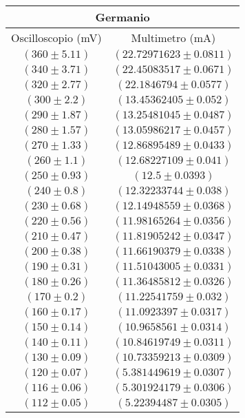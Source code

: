 \documentclass[@SRC@/main]{subfiles}
\begin{document}
\begin{center}
  \begin{tabular}{ ||c|c|| }
  \hline
  \multicolumn{2}{||c||}{Germanio}\\
  \hline
  Oscilloscopio (mV) & Multimetro (mA) \\
  \hline
  $(360\pm 5.11 )$ & $(22.72971623\pm 0.0811)$ \\
  \hline
  $(340\pm 3.71 )$ & $(22.45083517\pm 0.0671)$ \\
  \hline
  $(320\pm 2.77 )$ & $(22.1846794\pm 0.0577)$ \\
  \hline
  $(300\pm 2.2 )$ & $(13.45362405\pm 0.052)$\\
  \hline
   $(290\pm 1.87)$ & $(13.25481045\pm0.0487)$ \\
  \hline
   $(280\pm 1.57 )$ & $(13.05986217\pm0.0457)$ \\
  \hline
   $(270\pm 1.33 )$ & $(12.86895489\pm0.0433)$ \\
  \hline
   $(260\pm 1.1 )$ & $(12.68227109\pm0.041)$ \\
  \hline
  $(250\pm 0.93 )$ & $(12.5\pm0.0393)$ \\
  \hline
   $(240\pm 0.8 )$ & $(12.32233744\pm0.038)$ \\
  \hline
  $(230\pm 0.68  )$ & $(12.14948559\pm0.0368)$ \\
  \hline 
  $(220\pm 0.56 )$ & $(11.98165264\pm0.0356)$ \\
  \hline 
  $(210\pm 0.47 )$ & $(11.81905242\pm0. 0347)$ \\
  \hline 
  $(200\pm 0.38 )$ & $(11.66190379\pm0.0338)$ \\
  \hline 
  $(190\pm 0.31 )$ & $(11.51043005\pm0.0331)$ \\
  \hline 
  $(180\pm 0.26 )$ & $(11.36485812 \pm0.0326)$ \\
  \hline 
  $(170\pm 0.2 )$ & $(11.22541759 \pm0.032)$ \\
  \hline 
  $(160\pm 0.17 )$ & $(11.0923397	 \pm0.0317)$ \\
  \hline 
  $(150\pm 0.14 )$ & $(10.9658561 \pm0.0314)$ \\
  \hline 
  $(140\pm 0.11 )$ & $(10.84619749 \pm0.0311)$ \\
  \hline 
  $(130\pm 0.09 )$ & $(10.73359213\pm0.0309)$ \\
  \hline 
  $(120\pm 0.07 )$ & $(5.381449619 \pm0.0307)$ \\
  \hline 
  $(116\pm 0.06 )$ & $(5.301924179 \pm0.0306)$ \\
  \hline 
  $(112\pm 0.05 )$ & $(5.22394487 \pm0.0305)$ \\
  \hline 
 
  \end{tabular}   
 \end{center}
\end{document}
